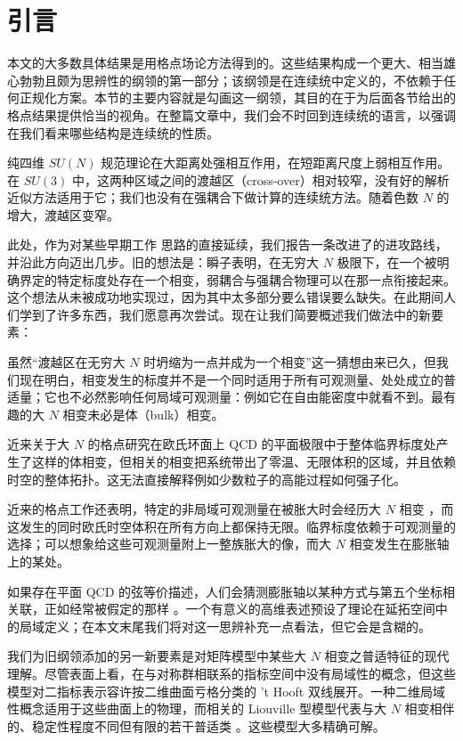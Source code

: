 \section{引言}

本文的大多数具体结果是用格点场论方法得到的。这些结果构成一个更大、相当雄心勃勃且颇为思辨性的纲领的第一部分；该纲领是在连续统中定义的，不依赖于任何正规化方案。本节的主要内容就是勾画这一纲领，其目的在于为后面各节给出的格点结果提供恰当的视角。在整篇文章中，我们会不时回到连续统的语言，以强调在我们看来哪些结构是连续统的性质。


纯四维 $SU(N)$ 规范理论在大距离处强相互作用，在短距离尺度上弱相互作用。在 $SU(3)$ 中，这两种区域之间的渡越区（cross-over）相对较窄，没有好的解析近似方法适用于它；我们也没有在强耦合下做计算的连续统方法。随着色数 $N$ 的增大，渡越区变窄。

此处，作为对某些早期工作 \cite{old1, gw12} 思路的直接延续，我们报告一条改进了的进攻路线，并沿此方向迈出几步。旧的想法是：瞬子表明，在无穷大 $N$ 极限下，在一个被明确界定的特定标度处存在一个相变，弱耦合与强耦合物理可以在那一点衔接起来。这个想法从未被成功地实现过，因为其中太多部分要么错误要么缺失。在此期间人们学到了许多东西，我们愿意再次尝试。现在让我们简要概述我们做法中的新要素：

虽然``渡越区在无穷大 $N$ 时坍缩为一点并成为一个相变''这一猜想由来已久，但我们现在明白，相变发生的标度并不是一个同时适用于所有可观测量、处处成立的普适量；它也不必然影响任何局域可观测量：例如它在自由能密度中就看不到。最有趣的大 $N$ 相变未必是体（bulk）相变。

近来关于大 $N$ 的格点研究在欧氏环面上 QCD 的平面极限中于整体临界标度处产生了这样的体相变，但相关的相变把系统带出了零温、无限体积的区域，并且依赖时空的整体拓扑。这无法直接解释例如少数粒子的高能过程如何强子化。

近来的格点工作还表明，特定的非局域可观测量在被胀大时会经历大 $N$ 相变 \cite{bulk2,knn}，而这发生的同时欧氏时空体积在所有方向上都保持无限。临界标度依赖于可观测量的选择；可以想象给这些可观测量附上一整族胀大的像，而大 $N$ 相变发生在膨胀轴上的某处。

如果存在平面 QCD 的弦等价描述，人们会猜测膨胀轴以某种方式与第五个坐标相关联，正如经常被假定的那样 \cite{poly3,malda4}。一个有意义的高维表述预设了理论在延拓空间中的局域定义；在本文末尾我们将对这一思辨补充一点看法，但它会是含糊的。

我们为旧纲领添加的另一新要素是对矩阵模型中某些大 $N$ 相变之普适特征的现代理解。尽管表面上看，在与对称群相联系的指标空间中没有局域性的概念，但这些模型对二指标表示容许按二维曲面亏格分类的 't Hooft 双线展开。一种二维局域性概念适用于这些曲面上的物理，而相关的 Liouville 型模型代表与大 $N$ 相变相伴的、稳定性程度不同但有限的若干普适类 \cite{doublesca5}。这些模型大多精确可解。

